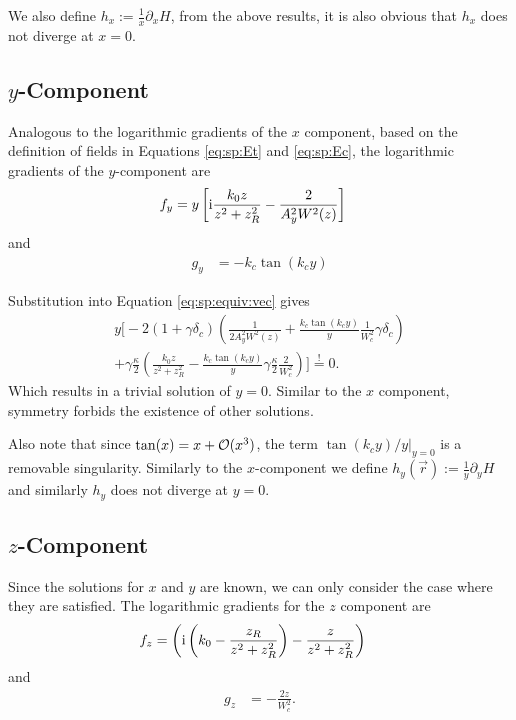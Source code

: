 We also define $h_x :=\tfrac1x\partial_x H$,
    from the above results, it is also obvious that $h_x$ does not diverge at $x = 0$.

\subsection{\texorpdfstring{$y$}{y}-Component}
\label{ssec:sp:extrem:y}

Analogous to the logarithmic gradients of the $x$ component,
    based on the definition of fields in Equations \eqref{eq:sp:Et} and \eqref{eq:sp:Ec},
    the logarithmic gradients of the $y$-component are
\begin{align}
    f_y &= y \left[ \mathrm{i}\frac{k_0z}{z^2+z_R^2} - \frac{2}{A_y^2 W^2(z)}\right]
    \end{align}
and
\begin{align}
    g_y &= - k_c\tan(k_c y)
\end{align}

Substitution into Equation \eqref{eq:sp:equiv:vec} gives
\begin{multline}
    y \Biggl[ 
        -2(1+\gamma \delta_c)\left( \frac{1}{2A_y^2W^2(z)} + \frac{k_c\tan(k_c y)}{y}\frac{1}{W_c^2}\gamma\delta_c \right) \\
        +\gamma\frac{\kappa}{2}\left( \frac{k_0z}{z^2+z_R^2}- \frac{k_c\tan(k_c y)}{y}\gamma\frac{\kappa}2 \frac{2}{W_c^2} \right) \Biggr]
        \overset{!}{=} 0.
\end{multline} 
Which results in a trivial solution of $y = 0$.
Similar to the $x$ component, symmetry forbids the existence of other solutions.

Also note that since $\tan(x) = x + \mathcal{O}(x^3)$,
    the term $\tan(k_c y)/y |_{y=0}$ is a removable singularity.
Similarly to the $x$-component we define $h_y(\vec r) := \tfrac1y \partial_y H$
    and similarly $h_y$ does not diverge at $y = 0$.
    
    
\subsection{\texorpdfstring{$z$}{z}-Component}
\label{ssec:sp:extrem:z}

Since the solutions for $x$ and $y$ are known,
    we can only consider the case where they are satisfied.
The logarithmic gradients for the $z$ component are
\begin{align}
    f_z &= \left( \mathrm{i} \left( k_0 -\frac{z_R}{z^2+z_R^2}\right) - \frac{z}{z^2+z_R^2} \right) 
\end{align}
and
\begin{align}
    g_z &= -\frac{2z}{W_c^2}.
\end{align}

